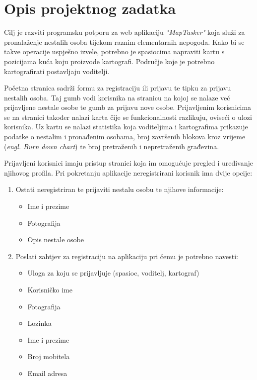 \chapter{Opis projektnog zadatka}
		
			\par
			Cilj je razviti programsku potporu za web aplikaciju \textit{"MapTasker"} koja služi za pronalaženje nestalih osoba tijekom raznim elementarnih nepogoda. Kako bi se takve operacije uspješno izvele, potrebno je spasiocima napraviti kartu s pozicijama kuća koju proizvode kartografi. Područje koje je potrebno kartografirati postavljaju voditelji.
			
			Početna stranica sadrži formu za registraciju ili prijavu te tipku za prijavu nestalih osoba. Taj gumb vodi korisnika na stranicu na kojoj se nalaze već prijavljene nestale osobe te gumb za prijavu nove osobe. Prijavljenim korisnicima se na stranici također nalazi karta čije se funkcionalnosti razlikuju, oviseći o ulozi korisnika. Uz kartu se nalazi statistika koja voditeljima i kartografima prikazuje podatke o nestalim i pronađenim osobama, broj završenih blokova kroz vrijeme (\textit{engl. Burn down chart}) te broj pretraženih i nepretraženih građevina.
			
			Prijavljeni korisnici imaju pristup stranici koja im omogućuje pregled i uređivanje njihovog profila.
			Pri pokretanju aplikacije neregistrirani korisnik ima dvije opcije:
			\begin{enumerate}
				\item Ostati neregistriran te prijaviti nestalu osobu te njihove informacije:
				\begin{itemize}
					\item Ime i prezime
					\item Fotografija
					\item Opis nestale osobe
				\end{itemize}
				\item Poslati zahtjev za registraciju na aplikaciju pri čemu je potrebno navesti:
				\begin{itemize}
					\item Uloga za koju se prijavljuje (spasioc, voditelj, kartograf)
					\item Korisničko ime
					\item Fotografija
					\item Lozinka
					\item Ime i prezime
					\item Broj mobitela
					\item Email adresa
				\end{itemize}
			\end{enumerate}
			
